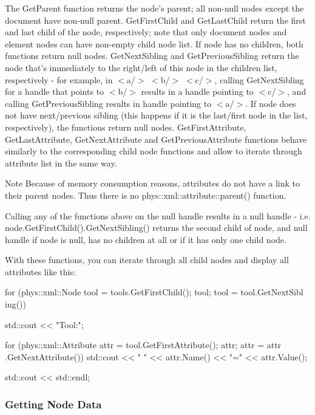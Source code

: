  The GetParent function returns the node's parent; all non-\/null nodes except the document have non-\/null parent. GetFirstChild and GetLastChild return the first and last child of the node, respectively; note that only document nodes and element nodes can have non-\/empty child node list. If node has no children, both functions return null nodes. GetNextSibling and GetPreviousSibling return the node that's immediately to the right/left of this node in the children list, respectively -\/ for example, in $<$a/$>$ $<$b/$>$ $<$c/$>$, calling GetNextSibling for a handle that points to $<$b/$>$ results in a handle pointing to $<$c/$>$, and calling GetPreviousSibling results in handle pointing to $<$a/$>$. If node does not have next/previous sibling (this happens if it is the last/first node in the list, respectively), the functions return null nodes. GetFirstAttribute, GetLastAttribute, GetNextAttribute and GetPreviousAttribute functions behave similarly to the corresponding child node functions and allow to iterate through attribute list in the same way. \begin{DoxyNote}{Note}
Because of memory consumption reasons, attributes do not have a link to their parent nodes. Thus there is no phys::xml::attribute::parent() function.
\end{DoxyNote}
Calling any of the functions above on the null handle results in a null handle -\/ i.e. node.GetFirstChild().GetNextSibling() returns the second child of node, and null handle if node is null, has no children at all or if it has only one child node. \par
 \par
 With these functions, you can iterate through all child nodes and display all attributes like this: 
\begin{DoxyCode}
 for (phys::xml::Node tool = tools.GetFirstChild(); tool; tool = tool.GetNextSibl
      ing())
 {
     std::cout << "Tool:";

     for (phys::xml::Attribute attr = tool.GetFirstAttribute(); attr; attr = attr
      .GetNextAttribute())
     {
         std::cout << " " << attr.Name() << "=" << attr.Value();
     }

     std::cout << std::endl;
 }
\end{DoxyCode}
 \hypertarget{XMLManual_XMLAccessingNodeData}{}\subsubsection{Getting Node Data}\label{XMLManual_XMLAccessingNodeData}
